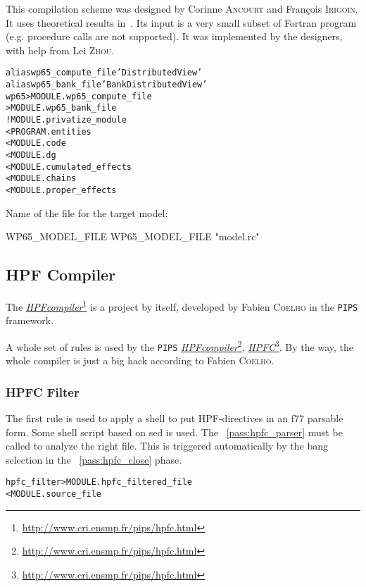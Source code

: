 \documentclass[a4paper]{report}
\newenvironment{PipsMake}{\begin{alltt}}{\end{alltt}}
\newcommand{\PipsPassRef}[1]{\texttt{\detokenize{#1}}~\ref{pass:#1}}
\newenvironment{PipsPass}[1]{\label{pass:#1}}{}
\newcommand{\LINK}[2]{\href{#2}{#1}\footnote{\url{#2}}\xspace}
\newcommand{\HPFC}{\LINK{\emph{HPFC}}{http://www.cri.ensmp.fr/pips/hpfc.html}}
\newcommand{\HPFcompiler}{\LINK{\emph{HPF\space{}compiler}}{http://www.cri.ensmp.fr/pips/hpfc.html}}
\newcommand{\Pips}{\texttt{PIPS}}
\begin{document}
This compilation scheme was designed by Corinne \textsc{Ancourt} and Fran\c{c}ois
\textsc{Irigoin}. It uses theoretical results in~\cite{AI91}. Its input is a very
small subset of Fortran program (e.g. procedure calls are not supported).
It was implemented by the designers, with help from Lei \textsc{Zhou}.

\begin{PipsMake}
alias wp65_compute_file 'Distributed View'
alias wp65_bank_file 'Bank Distributed View'
wp65                            > MODULE.wp65_compute_file
                                > MODULE.wp65_bank_file
        ! MODULE.privatize_module
        < PROGRAM.entities
        < MODULE.code
        < MODULE.dg
        < MODULE.cumulated_effects
        < MODULE.chains
        < MODULE.proper_effects

\end{PipsMake}

Name of the file for the target model:
\begin{PipsProp}{WP65_MODEL_FILE}
WP65_MODEL_FILE "model.rc"
\end{PipsProp}

\subsection{HPF Compiler}
\label{subsubsection-hpf-compiler}

The \HPFcompiler{} is a project by itself, developed by Fabien
\textsc{Coelho} in the \Pips{} framework.

A whole set of rules is used by the \Pips{} \HPFcompiler{}, \HPFC{}.  By
the way, the whole compiler is just a big hack according to Fabien
\textsc{Coelho}.

\subsubsection{HPFC Filter}

The first rule is used to apply a shell to put HPF-directives in an f77 parsable form.
Some shell script based on sed is used. The \PipsPassRef{hpfc_parser} must be
called to analyze the right file. This is triggered automatically by the
bang selection in the \PipsPassRef{hpfc_close} phase.
\begin{PipsPass}{hpfc_filter}
\end{PipsPass}

\begin{PipsMake}
hpfc_filter             > MODULE.hpfc_filtered_file
    < MODULE.source_file
\end{PipsMake}
\end{document}
